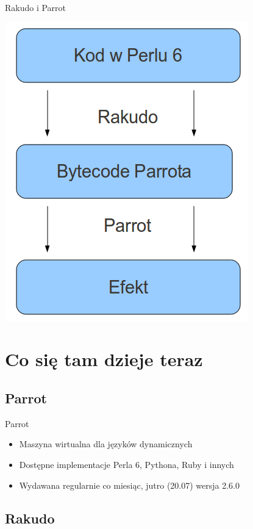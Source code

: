 \documentclass{beamer}
\begin{document}
\begin{frame}{Rakudo i Parrot}
	\begin{center}
		\includegraphics[scale=0.4]{bohomaz}
	\end{center}
\end{frame}
			\section{Co się tam dzieje teraz}
			\subsection{Parrot}

\begin{frame}{Parrot}
	\begin{itemize}
		\item Maszyna wirtualna dla języków dynamicznych
		\item Dostępne implementacje Perla 6, Pythona, Ruby i innych
		\item Wydawana regularnie co miesiąc, jutro (20.07) wersja 2.6.0 
	\end{itemize}
\end{frame}

			\subsection{Rakudo}
\end{document}
